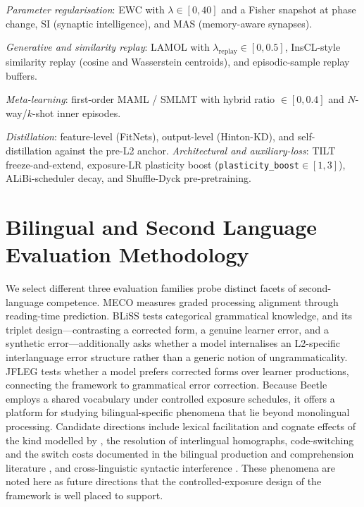 \documentclass[11pt]{article}
\newcommand{\beetle}{Beetle} %
\begin{document}
\emph{Parameter regularisation}: EWC \citep{kirkpatrick2017overcoming} with $\lambda\in[0,40]$ and a Fisher snapshot at phase change, SI (synaptic intelligence), and MAS (memory-aware synapses). 

\emph{Generative and similarity replay}: LAMOL \citep{sun2019lamol} with $\lambda_{\text{replay}}\in[0,0.5]$, InsCL-style similarity replay (cosine and Wasserstein centroids), and episodic-sample replay buffers. 

\emph{Meta-learning}: first-order MAML / SMLMT \citep{bansal-etal-2020-self,africa-etal-2025-learning,africa-etal-2025-meta} with hybrid ratio $\in[0,0.4]$ and $N$-way/$k$-shot inner episodes. 

\emph{Distillation}: feature-level (FitNets), output-level (Hinton-KD), and self-distillation against the pre-L2 anchor. \emph{Architectural and auxiliary-loss}: TILT freeze-and-extend, exposure-LR plasticity boost (\texttt{plasticity\_boost}$\in[1,3]$), ALiBi-scheduler decay, and Shuffle-Dyck pre-pretraining. 
 



\section{Bilingual and Second Language Evaluation Methodology}\label{app:pmeco-future}

We select different three evaluation families probe distinct facets of second-language competence. MECO measures graded processing alignment through reading-time prediction. BLiSS \citep{gao2025bliss} tests categorical grammatical knowledge, and its triplet design---contrasting a corrected form, a genuine learner error, and a synthetic error---additionally asks whether a model internalises an L2-specific interlanguage error structure rather than a generic notion of ungrammaticality. JFLEG \citep{napoles-etal-2017-jfleg} tests whether a model prefers corrected forms over learner productions, connecting the framework to grammatical error correction. Because \beetle{} employs a shared vocabulary under controlled exposure schedules, it offers a platform for studying bilingual-specific phenomena that lie beyond monolingual processing. Candidate directions include lexical facilitation and cognate effects of the kind modelled by \citet{dijkstra2002architecture}, the resolution of interlingual homographs, code-switching and the switch costs documented in the bilingual production and comprehension literature \citep{meuter1999bilingual,gollan2009should}, and cross-linguistic syntactic interference \citep{hartsuiker2004crosslinguistic}. These phenomena are noted here as future directions that the controlled-exposure design of the framework is well placed to support.
\end{document}
